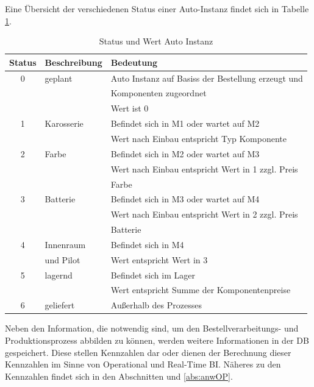 Eine Übersicht der verschiedenen Status einer Auto-Instanz findet sich in Tabelle \ref{tab:status}.
\begin{table}[H]
    \centering
    \begin{tabular}{|c|l|l|}
     \toprule
     \hline
         \textbf{Status}& \textbf{Beschreibung} & \textbf{Bedeutung} \\ \hline
          0 & geplant & Auto Instanz auf Basiss der Bestellung erzeugt und\\
           &&Komponenten zugeordnet\\
           &&Wert ist 0\\ \hline
          1 & Karosserie & Befindet sich in M1 oder wartet auf M2\\
          &&Wert nach Einbau entspricht Typ Komponente\\ \hline
          2 & Farbe & Befindet sich in M2 oder wartet auf M3\\
          &&Wert nach Einbau entspricht Wert in 1 zzgl. Preis \\
          &&Farbe\\ \hline
          3 & Batterie & Befindet sich in M3 oder wartet auf M4\\
          &&Wert nach Einbau entspricht Wert in 2 zzgl. Preis \\
          &&Batterie\\ \hline
          4 & Innenraum & Befindet sich in M4\\
          &und Pilot&Wert entspricht Wert in 3\\ \hline
          5 & lagernd& Befindet sich im Lager\\
          &&Wert entspricht Summe der Komponentenpreise\\ \hline
          6 & geliefert& Außerhalb des Prozesses\\ \hline
    \bottomrule
    \end{tabular}
    \caption{Status und Wert Auto Instanz}
    \label{tab:status}
\end{table}
Neben den Information, die notwendig sind, um den Bestellverarbeitungs- und Produktionsprozess abbilden zu können, werden weitere Informationen in der \ac{DB} gespeichert. Diese stellen Kennzahlen dar oder dienen der Berechnung dieser Kennzahlen im Sinne von Operational und Real-Time \ac{BI}. Näheres zu den Kennzahlen findet sich in den Abschnitten \label{abs:Kenn} und \ref{abs:anwOP}.


